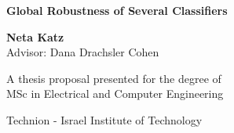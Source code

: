 
\begin{titlepage}
   \begin{center}

       \huge
       \textbf{Global Robustness of Several Classifiers}

       \vspace*{1cm}






%

       \vspace{2.5cm}

        \Large
        \textbf{Neta Katz} \\
        
        Advisor: Dana Drachsler Cohen\\


       \vfill

       A thesis proposal presented for the degree of\\
       MSc in Electrical and Computer Engineering

       \vspace{0.8cm}


       Technion - Israel Institute of Technology\\

   \end{center}
\end{titlepage} 